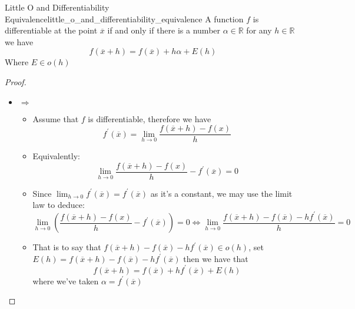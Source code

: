 \begin{proposition}{Little O and Differentiability Equivalence}{little_o_and_differentiability_equivalence}
  A function $f$ is differentiable at the point $\overline{x}$ if and only if there is a number $ \alpha \in \mathbb{R}$ for any $h \in \mathbb{R}$ we have 
  \[
  f\left(\overline{x}  +  h\right) = f\left(\overline{x}\right)  +  h \alpha  +  E\left(h\right)
  \]
  Where $E \in o\left(h\right) $ 

\end{proposition}

\begin{proof}
    \begin{itemize}
      \item $\Rightarrow$ 
        \begin{itemize}
          \item Assume that $f$ is differentiable, therefore we have
              \[
              f ^{ \prime } \left( \overline{x} \right) =  \lim_{ h \to 0 } \frac{f\left( \overline{x} +  h \right) -  f\left( x \right) }{h}
              \]
            \item Equivalently:
              \[
               \lim_{ h \to 0 } \frac{f\left( \overline{x} +  h \right) -  f\left( x \right) }{h} -  f ^{ \prime } \left( \overline{x} \right) = 0
              \]
            \item Since $ \lim_{ h \to 0 } f ^{ \prime } \left( \overline{x} \right) = f ^{ \prime } \left( \overline{x} \right)  $ as it's a constant, we may use the limit law to deduce:
            \[
            \lim_{ h \to 0 } \left( \frac{f\left( \overline{x} + h \right) - f\left( x \right) }{h} - f ^{ \prime } \left( \overline{x} \right) \right) = 0 \Leftrightarrow \lim_{ h \to 0 } \frac{f\left( \overline{x} + h \right) - f\left( \overline{x} \right) - h f ^{ \prime } \left( \overline{x} \right) }{h}= 0
            \]
            \item That is to say that $ f\left( \overline{x} + h \right) - f\left( \overline{x} \right) - h f ^{ \prime } \left( \overline{x} \right) \in o\left( h \right)  $, set $ E\left( h \right) = f\left( \overline{x} + h \right) - f\left( \overline{x} \right) - h f ^{ \prime } \left( \overline{x} \right)  $ then we have that
            \[
            f\left( \overline{x} + h \right) =  f\left( \overline{x} \right) +  h f ^{ \prime } \left( \overline{x} \right) +  E\left( h \right) 
            \]
            where we've taken $ \alpha = f ^{ \prime } \left( \overline{x} \right)  $ 
        \end{itemize}

\end{itemize}
\end{proof}

